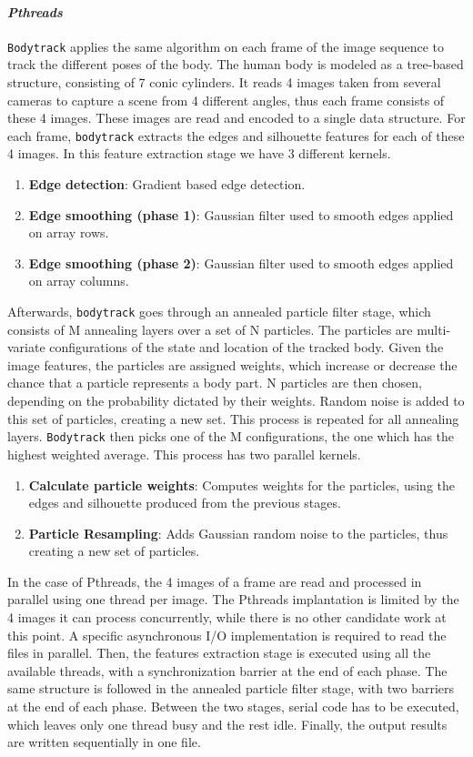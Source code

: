 \paragraph{\textit{Pthreads}} \texttt{Bodytrack} applies the same algorithm on each frame
of the image sequence to track the different poses of the body.  The human body is modeled
as a tree-based structure, consisting of 7 conic cylinders.  It reads 4 images taken from
several cameras to capture a scene from 4 different angles, thus each frame consists of
these 4 images.  These images are read and encoded to a single data structure.  For each
frame, \texttt{bodytrack} extracts the edges and silhouette features for each of these 4
images.
In this feature extraction stage we have 3 different kernels.
\begin{enumerate}
	\item \textbf{Edge detection}: Gradient based edge detection.
	\item \textbf{Edge smoothing (phase 1)}: Gaussian filter used to smooth edges applied on array rows.
	\item \textbf{Edge smoothing (phase 2)}: Gaussian filter used to smooth edges applied on array columns.
\end{enumerate}
Afterwards, \texttt{bodytrack} goes through an annealed particle filter stage, which
consists of M annealing layers over a set of N particles.  The particles are multi-variate
configurations of the state and location of the tracked body.  Given the image features,
the particles are assigned weights, which increase or decrease the chance that a particle
represents a body part.  N particles are then chosen, depending on the probability
dictated by their weights.  Random noise is added to this set of particles, creating a new
set.  This process is repeated for all annealing layers. \texttt{Bodytrack} then picks one
of the M configurations, the one which has the highest weighted average.  This process has
two parallel kernels.
\begin{enumerate}[resume]
	\item \textbf{Calculate particle weights}: Computes weights for the particles, using the edges and silhouette produced from the previous stages.
	\item \textbf{Particle Resampling}: Adds Gaussian random noise to the particles, thus creating a new set of particles.
\end{enumerate}

In the case of Pthreads, the 4 images of a frame are read and processed in parallel using
one thread per image.  The Pthreads implantation is limited by the 4 images it can process
concurrently, while there is no other candidate work at this point.  A specific
asynchronous I/O implementation is required to read the files in parallel. Then, the
features extraction stage is executed using all the available threads, with a
synchronization barrier at the end of each phase. The same structure is followed in the
annealed particle filter stage, with two barriers at the end of each phase. Between the
two stages, serial code has to be executed, which leaves only one thread busy and the rest
idle.  Finally, the output results are written sequentially in one file.   


